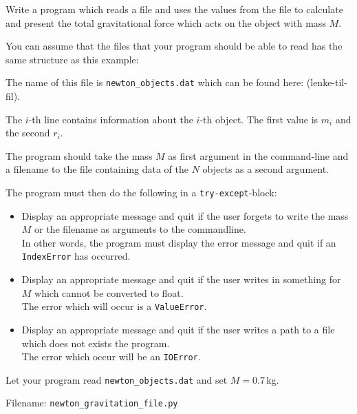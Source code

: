 \documentclass[10pt,a4paper]{article}
\begin{document}
Write a program which reads a file and uses the values from the file to calculate and present the total gravitational force which acts on the object with mass $M$. 

You can assume that the files that your program should be able to read has the same structure as this example:

The name of this file is \texttt{newton\_objects.dat}  which can be found here: (lenke-til-fil).

The $i$-th line contains information about the $i$-th object. The first value is $m_i$ and the second $r_i$. 

The program should take the mass $M$ as first argument in the command-line and a filename to the file containing data of the $N$ objects as a second argument. 

The program must then do the following in a \texttt{try-except}-block:
\begin{itemize}
	\item Display an appropriate message and quit if the user forgets to write the mass $M$ or the filename as arguments to the commandline. \\
	In other words, the program must display the error message and quit if an \texttt{IndexError} has occurred. 
	\item Display an appropriate message and quit if the user writes in something for $M$ which cannot be converted to float. \\The error which will occur is a \texttt{ValueError}.  
	\item Display an appropriate message and quit if the user writes a path to a file which does not exists the program. \\The error which occur will be an \texttt{IOError}. 
\end{itemize}

Let your program read \texttt{newton\_objects.dat} and set $M = 0.7\,$kg.

Filename: \texttt{newton\_gravitation\_file.py}
\end{document}
